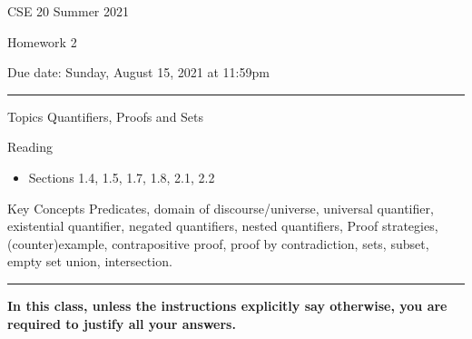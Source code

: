 \documentclass[10pt,letterpaper,unboxed,cm]{article}
\begin{document}
\hfill{CSE 20 Summer 2021}

\hfill{Homework 2}

\hfill{Due date: Sunday, August 15, 2021 at 11:59pm}

\begin{center}
\begin{minipage}[t]{6in}
\rule{\linewidth}{2pt}

{\sc Topics} Quantifiers, Proofs and Sets
\newline

{\sc Reading} 
\begin{itemize}
\item
Sections 1.4, 1.5, 1.7, 1.8, 2.1, 2.2
\end{itemize}

{\sc Key Concepts} Predicates, domain of discourse/universe, universal quantifier, existential quantifier, negated quantifiers, nested quantifiers, Proof strategies, (counter)example, contrapositive proof, proof by contradiction, sets, subset, empty set union, intersection.
\newline

\rule{\linewidth}{2pt}
\end{minipage} \hfill

\end{center}



\textbf{In this class, unless the instructions explicitly say otherwise, you are required to justify all your answers.}

 
\end{document}
